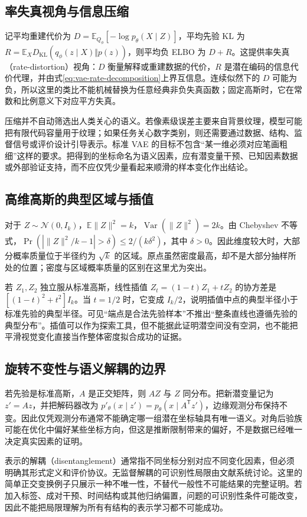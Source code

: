 \documentclass[UTF8,12pt,a4paper,fontset=fandol]{ctexart}
\begin{document}
\subsection{率失真视角与信息压缩}
记平均重建代价为 $D=\mathbb E_{Q_\phi}[-\log p_\theta(X\mid Z)]$，平均先验 KL 为 $R=\mathbb E_X D_{\mathrm{KL}}(q_\phi(z\mid X)\Vert p(z))$，则平均负 ELBO 为 $D+R$。这提供率失真（rate-distortion）视角：$D$ 衡量解释或重建数据的代价，$R$ 是潜在编码的信息代价代理，并由式\eqref{eq:vae-rate-decomposition}上界互信息。连续似然下的 $D$ 可能为负，所以这里的类比不能机械替换为任意经典非负失真函数；固定高斯时，它在常数和比例意义下对应平方失真。

压缩并不自动筛选出人类关心的语义。若像素级误差主要来自背景纹理，模型可能把有限代码容量用于纹理；如果任务关心数字类别，则还需要通过数据、结构、监督信号或评价设计引导表示。标准 VAE 的目标不包含“某一维必须对应笔画粗细”这样的要求。把得到的坐标命名为语义因素，应有潜变量干预、已知因素数据或外部验证支持，而不应仅凭少量看起来顺滑的样本变化作出结论。

\subsection{高维高斯的典型区域与插值}
对于 $Z\sim\mathcal N(0,I_k)$，$\mathbb E\|Z\|^2=k$，$\operatorname{Var}(\|Z\|^2)=2k$。由 Chebyshev 不等式，$\Pr(|\|Z\|^2/k-1|>\delta)\leq2/(k\delta^2)$，其中 $\delta>0$。因此维度较大时，大部分概率质量位于半径约为 $\sqrt{k}$ 的区域。原点虽然密度最高，却不是大部分抽样所处的位置；密度与区域概率质量的区别在这里尤为突出。

若 $Z_1,Z_2$ 独立服从标准高斯，线性插值 $Z_t=(1-t)Z_1+tZ_2$ 的协方差是 $[(1-t)^2+t^2]I_k$。当 $t=1/2$ 时，它变成 $I_k/2$，说明插值中点的典型半径小于标准先验的典型半径。可见“端点是合法先验样本”不推出“整条直线也遵循先验的典型分布”。插值可以作为探索工具，但不能据此证明潜空间没有空洞，也不能把平滑视觉变化直接当作整体密度拟合成功的证据。

\subsection{旋转不变性与语义解耦的边界}
若先验是标准高斯，$A$ 是正交矩阵，则 $AZ$ 与 $Z$ 同分布。把新潜变量记为 $z'=Az$，并把解码器改为 $p'_{\theta}(x\mid z')=p_\theta(x\mid A^\mathsf Tz')$，边缘观测分布保持不变。因此仅凭观测分布通常不能确定哪一组潜在坐标轴具有唯一语义。对角后验族可能在优化中偏好某些坐标方向，但这是推断限制带来的偏好，不是数据已经唯一决定真实因素的证明。

表示的解耦（disentanglement）通常指不同坐标分别对应不同变化因素，但必须明确其形式定义和评价协议。无监督解耦的可识别性局限由文献\cite{locatello2019}系统讨论。这里的简单正交变换例子只展示一种不唯一性，不替代一般性不可能结果的完整证明。若加入标签、成对干预、时间结构或其他归纳偏置，问题的可识别性条件可能改变，因此不能把局限理解为所有有结构的表示学习都不可能成功。
\end{document}
